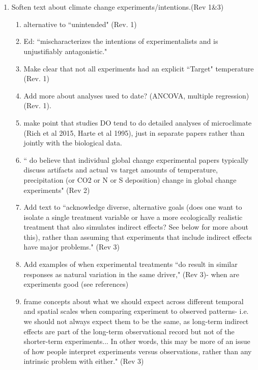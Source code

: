 \documentclass[12pt,a4paper]{article}
\begin{document}
 

\\
\\
\begin{enumerate}
\item Soften text about climate change experiments/intentions.(Rev 1\&3) 
\begin{enumerate}
\item alternative to ``unintended" (Rev. 1)
\item Ed: ``mischaracterizes the intentions of experimentalists and is unjustifiably antagonistic."
\item Make clear that not all experiments had an explicit ``Target" temperature (Rev. 1)
\item Add more about analyses used to date? (ANCOVA, multiple regression) (Rev. 1).
\item make point that studies DO tend to do detailed analyses of microclimate (Rich et al 2015, Harte et al 1995), just in separate papers rather than jointly with the biological data. 
\item `` do believe that individual global change experimental papers typically discuss artifacts and actual vs target amounts of temperature, precipitation (or CO2 or N or S deposition) change in global change experiments" (Rev 2)
\item Add text to ``acknowledge diverse, alternative goals (does one want to isolate a single treatment variable or have a more ecologically realistic treatment that also
simulates indirect effects? See below for more about this), rather than assuming that experiments that include indirect effects have major problems." (Rev 3)
\item Add examples of when  experimental treatments ``do result in similar responses as natural variation in the same driver," (Rev 3)- when are experiments good (see references)
\item  frame concepts about what we should expect across different temporal and spatial scales when comparing experiment to observed patterns- i.e. we should
not always expect them to be the same, as long-term indirect effects are part of the long-term observational record but not of the shorter-term experiments... In other words, this may be more of an issue of how people interpret experiments versus observations, rather than any intrinsic problem with either." (Rev 3)

\end{enumerate}
\end{enumerate}
\end{document}
